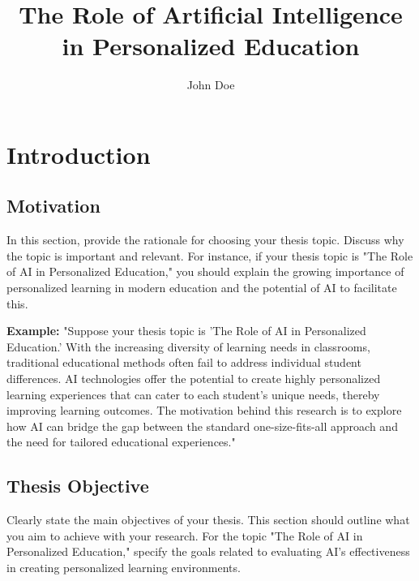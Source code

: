\documentclass[english,f,master,binding,twoside,palatino, scrreprt]{WeSTthesis}
\author{John Doe}
\title{The Role of Artificial Intelligence in Personalized Education}
\begin{document}
\maketitle%


\tableofcontents%

\cleardoublepage%



\chapter{Introduction}
\section{Motivation}
In this section, provide the rationale for choosing your thesis topic. Discuss why the topic is important and relevant. For instance, if your thesis topic is "The Role of AI in Personalized Education," you should explain the growing importance of personalized learning in modern education and the potential of AI to facilitate this.

\textbf{Example:}  
"Suppose your thesis topic is 'The Role of AI in Personalized Education.' With the increasing diversity of learning needs in classrooms, traditional educational methods often fail to address individual student differences. AI technologies offer the potential to create highly personalized learning experiences that can cater to each student’s unique needs, thereby improving learning outcomes. The motivation behind this research is to explore how AI can bridge the gap between the standard one-size-fits-all approach and the need for tailored educational experiences."

\section{Thesis Objective}
Clearly state the main objectives of your thesis. This section should outline what you aim to achieve with your research. For the topic "The Role of AI in Personalized Education," specify the goals related to evaluating AI's effectiveness in creating personalized learning environments.
\end{document}
